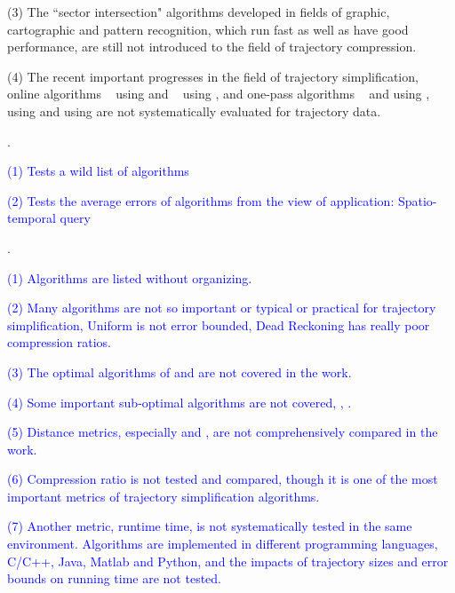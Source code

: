 {\ni (3) The ``sector intersection" algorithms \cite{Williams:Longest, Sklansky:Cone, Dunham:Cone, Zhao:Sleeve} developed in fields of graphic, cartographic and pattern recognition, which run fast as well as have good performance, are still not introduced to the field of trajectory compression.

\ni (4) The recent important progresses in the field of trajectory simplification, \ie online algorithms \squishe~\cite{Muckell:Compression} using \sed and \bqsa~\cite{Liu:BQS} using \ped, and one-pass algorithms \operb~\cite{Lin:Operb} and \siped \cite{Williams:Longest, Sklansky:Cone, Dunham:Cone, Zhao:Sleeve} using \ped, \cised~\cite{Lin:Cised} using \sed and \interval \cite{Ke:Interval} using \dad are not systematically evaluated for trajectory data.

.

\textcolor{blue}{(1) Tests a wild list of algorithms}

\textcolor{blue}{(2) Tests the average errors of algorithms from the view of application: Spatio-temporal query}

.

\textcolor{blue}{(1) Algorithms are listed without organizing.}

\textcolor{blue}{(2) Many algorithms are not so important or typical or practical for trajectory simplification, \eg Uniform is not error bounded, Dead Reckoning has really poor compression ratios.}

\textcolor{blue}{(3) The optimal algorithms of \ped and \sed are not covered in the work.}

\textcolor{blue}{(4) Some important sub-optimal algorithms are not covered, \eg \sleeve, \cised.}

\textcolor{blue}{(5) Distance metrics, especially \ped and \sed, are not comprehensively compared in the work.}

\textcolor{blue}{(6) Compression ratio is not tested and compared, though it is one of the most important metrics of trajectory simplification algorithms.}

\textcolor{blue}{(7) Another metric, runtime time, is not systematically tested in the same environment. Algorithms are implemented in different programming languages, \ie C/C++, Java, Matlab and Python, and the impacts of trajectory sizes and error bounds on running time are not tested.}

}
